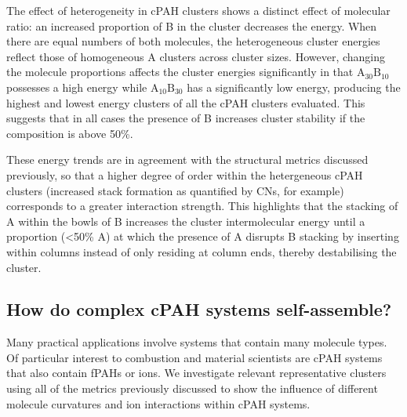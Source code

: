 The effect of heterogeneity in cPAH clusters shows a distinct effect of molecular ratio: an increased proportion of B in the cluster decreases the energy. When there are equal numbers of both molecules, the heterogeneous cluster energies reflect those of homogeneous A clusters across cluster sizes. However, changing the molecule proportions affects the cluster energies significantly in that $\text{A}_{\text{30}}\text{B}_{\text{10}}$ possesses a high energy while $\text{A}_{\text{10}}\text{B}_{\text{30}}$ has a significantly low energy, producing the highest and lowest energy clusters of all the cPAH clusters evaluated. This suggests that in all cases the presence of B increases cluster stability if the composition is above 50\%.

These energy trends are in agreement with the structural metrics discussed previously, so that a higher degree of order within the hetergeneous cPAH clusters (increased stack formation as quantified by CNs, for example) corresponds to a greater interaction strength. This highlights that the stacking of A within the bowls of B increases the cluster intermolecular energy until a proportion (<50\% A) at which the presence of A disrupts B stacking by inserting within columns instead of only residing at column ends, thereby destabilising the cluster. %

\subsection{How do complex cPAH systems self-assemble?}
Many practical applications involve systems that contain many molecule types. Of particular interest to combustion and material scientists are cPAH systems that also contain fPAHs or ions. We investigate relevant representative clusters using all of the metrics previously discussed to show the influence of different molecule curvatures and ion interactions within cPAH systems.

